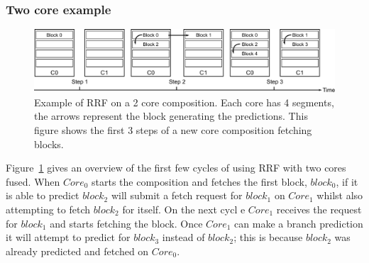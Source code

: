 \subsubsection{Two core example}
	
\begin{figure}[t]
    \centering
    \includegraphics[width=1\textwidth]{chapter3/graphics/fetching-model.pdf}

    \caption{Example of RRF on a 2 core composition. Each core has 4 segments, the arrows represent the block generating the predictions. This figure shows the first 3 steps of a new core composition fetching blocks.}
    \label{fig:new_fetch_ex}
\vspace{1em}
	\end{figure}
Figure~\ref{fig:new_fetch_ex} gives an overview of the first few cycles of using RRF with two cores fused.
When $Core_0$ starts the composition and fetches the first block, $block_0$, if it is able to predict $block_2$ will submit a fetch request for $block_1$ on $Core_1$ whilst also attempting to fetch $block_2$ for itself.
On the next cycl	e $Core_1$ receives the request for $block_1$ and starts fetching the block.
Once $Core_1$ can make a branch prediction it will attempt to predict for $block_3$ instead of $block_2$; this is because $block_2$ was already predicted and fetched on $Core_0$.




